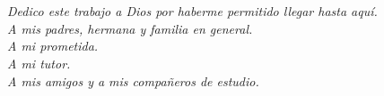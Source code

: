 \section*{}

\vfill
    \begin{flushright}
        \textit{
        Dedico este trabajo a Dios por haberme permitido llegar hasta aquí.\\
        A mis padres, hermana y familia en general.\\
        A mi prometida.\\
        A mi tutor.\\
        A mis amigos y a mis compañeros de estudio.
    }
\end{flushright}

\pagestyle{empty}
